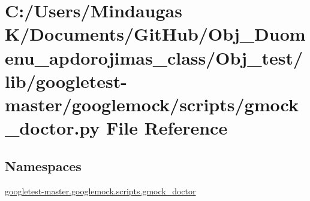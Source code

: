 \hypertarget{_obj__test_2lib_2googletest-master_2googlemock_2scripts_2gmock__doctor_8py}{}\section{C\+:/\+Users/\+Mindaugas K/\+Documents/\+Git\+Hub/\+Obj\+\_\+\+Duomenu\+\_\+apdorojimas\+\_\+class/\+Obj\+\_\+test/lib/googletest-\/master/googlemock/scripts/gmock\+\_\+doctor.py File Reference}
\label{_obj__test_2lib_2googletest-master_2googlemock_2scripts_2gmock__doctor_8py}
\subsection*{Namespaces}
\begin{DoxyCompactItemize}
\item 
 \mbox{\hyperlink{namespacegoogletest-master_1_1googlemock_1_1scripts_1_1gmock__doctor}{googletest-\/master.\+googlemock.\+scripts.\+gmock\+\_\+doctor}}
\end{DoxyCompactItemize}
